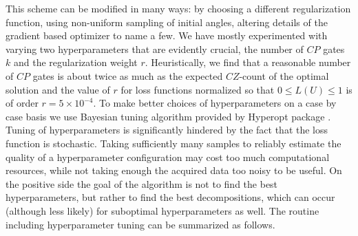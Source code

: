 \documentclass[amsfonts, amssymb, aps, nofootinbib]{revtex4-2}
\begin{document}
This scheme can be modified in many ways: by choosing a different regularization function, using non-uniform sampling of initial angles, altering details of the gradient based optimizer to name a few. We have mostly experimented with varying two hyperparameters that are evidently crucial, the number of $CP$ gates $k$ and the regularization weight $r$. Heuristically, we find that a reasonable number of $CP$ gates is about twice as much as the expected $CZ$-count of the optimal solution and the value of $r$ for loss functions normalized so that $0\le L(U) \le 1$ is of order $r=5\times 10^{-4}$. To make better choices of hyperparameters on a case by case basis we use Bayesian tuning algorithm provided by Hyperopt package \cite{hyperopt, ?}. Tuning of hyperparameters is significantly hindered by the fact that the loss function is stochastic. Taking sufficiently many samples to reliably estimate the quality of a hyperparameter configuration may cost too much computational resources, while not taking enough the acquired data too noisy to be useful. On the positive side the goal of the algorithm is not to find the best hyperparameters, but rather to find the best decompositions, which can occur (although less likely) for suboptimal hyperparameters as well. The routine including hyperparameter tuning can be summarized as follows.
\end{document}
